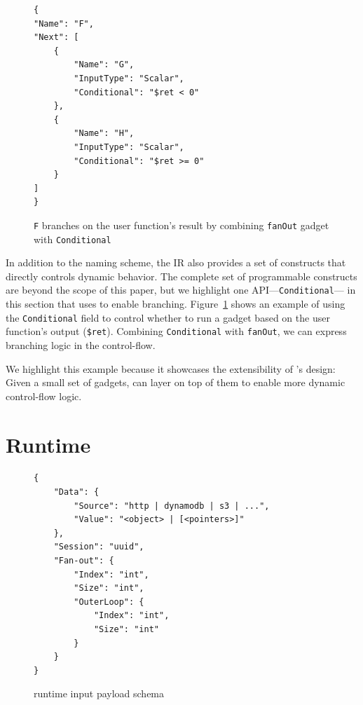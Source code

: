 \begin{figure}[]
    \begin{verbatim}
{
"Name": "F",
"Next": [
    {
        "Name": "G",
        "InputType": "Scalar",
        "Conditional": "$ret < 0"
    },
    {
        "Name": "H",
        "InputType": "Scalar",
        "Conditional": "$ret >= 0"
    }
]
}
    \end{verbatim}
    \caption{\texttt{F} branches on the user function's result by
    combining \texttt{fanOut} gadget with \texttt{Conditional}}
    \label{fig:gadget-examples-branch}
\end{figure}

In addition to the naming scheme, the IR also provides a set of constructs
that directly controls dynamic behavior. The complete set of programmable
constructs are beyond the scope of this paper, but we highlight one
API---\texttt{Conditional}--- in this section that \name{} uses to enable
branching. Figure~\ref{fig:gadget-examples-branch} shows an example of using
the \texttt{Conditional} field to control whether to run a gadget based on the
user function's output (\texttt{\$ret}). Combining \texttt{Conditional} with
\texttt{fanOut}, we can express branching logic in the control-flow. 

We highlight this example because it showcases the extensibility of \name{}'s
design: Given a small set of gadgets, \name{} can layer on top of them to
enable more dynamic control-flow logic.


\section{Runtime}

\begin{figure}[]
    \begin{verbatim}
{
    "Data": {
        "Source": "http | dynamodb | s3 | ...",
        "Value": "<object> | [<pointers>]"
    },
    "Session": "uuid",
    "Fan-out": {
        "Index": "int",
        "Size": "int",
        "OuterLoop": {
            "Index": "int",
            "Size": "int"
        }
    }
}
    \end{verbatim}
    \caption{\name{} runtime input payload schema}
    \label{fig:input-format}
\end{figure}

